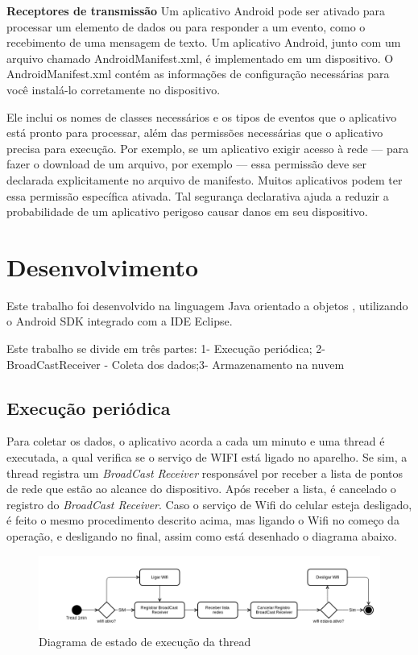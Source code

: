 \documentclass[12pt, %
openright, 
oneside, %
a4paper,    %
brazil]{facom-ufu-abntex2}
\begin{document}
\textbf{Receptores de transmissão}
Um aplicativo Android pode ser ativado para processar um elemento de dados ou para responder a um evento, como o recebimento de uma mensagem de texto.
Um aplicativo Android, junto com um arquivo chamado AndroidManifest.xml, é implementado em um dispositivo. O AndroidManifest.xml contém as informações de configuração necessárias para você instalá-lo corretamente no dispositivo.

 Ele inclui os nomes de classes necessários e os tipos de eventos que o aplicativo está pronto para processar, além das permissões necessárias que o aplicativo precisa para execução. Por exemplo, se um aplicativo exigir acesso à rede — para fazer o download de um arquivo, por exemplo — essa permissão deve ser declarada explicitamente no arquivo de manifesto. Muitos aplicativos podem ter essa permissão específica ativada. Tal segurança declarativa ajuda a reduzir a probabilidade de um aplicativo perigoso causar danos em seu dispositivo.\cite{IBM:Android}




\chapter{Desenvolvimento}
Este trabalho foi desenvolvido na linguagem Java orientado a objetos , utilizando o Android SDK integrado com a IDE Eclipse. 

Este trabalho se divide em três partes: 1- Execução periódica; 2- BroadCastReceiver - Coleta dos dados;3- Armazenamento na nuvem


\section{Execução periódica} 
Para coletar os dados, o aplicativo acorda a cada um minuto e uma thread é executada, a qual verifica se o serviço de WIFI está ligado no aparelho. Se sim, a thread registra um \emph{BroadCast Receiver} responsável por receber a lista de pontos de rede que estão ao alcance do dispositivo. Após receber a lista, é cancelado o registro do \emph{BroadCast Receiver}.
Caso o serviço de Wifi do celular esteja desligado, é feito o mesmo procedimento descrito acima, mas ligando o Wifi no começo da operação, e desligando no final, assim como está desenhado o diagrama abaixo.
\begin{figure}[!htb]
    \centering
    \includegraphics[scale=0.45,natwidth=610,natheight=64]{pherocast1.png}    \caption{Diagrama de estado de execução da thread}
    \label{figRotulo}
  \end{figure}
\end{document}
